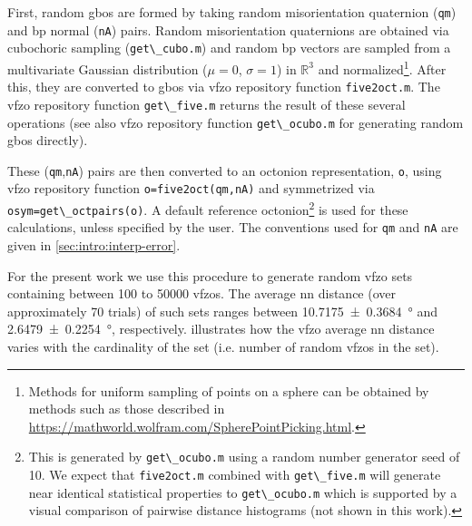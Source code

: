 \documentclass[final,twocolumn,12pt]{elsarticle}
\newcommand{\matlab}[1]{\mbox{\lstinline[style=Matlab-editor]{#1}}}
\newcommand{\vfzorepo}{\gls{vfzo} repository}
\begin{document}
First, random \glspl{gbo} are formed by taking random misorientation quaternion (\matlab{qm}) and \gls{bp} normal (\matlab{nA}) pairs. Random misorientation quaternions are obtained via cubochoric sampling \cite{singhOrientationSamplingDictionarybased2016} (\matlab{get\_cubo.m}) and random \gls{bp} vectors are sampled from a multivariate Gaussian distribution ($\mu=0$, $\sigma=1$) in $\mathbb{R}^3$ and normalized\footnote{Methods for uniform sampling of points on a sphere can be obtained by methods such as those described in \url{https://mathworld.wolfram.com/SpherePointPicking.html}. }. After this, they are converted to \glspl{gbo} via \vfzorepo{} function \matlab{five2oct.m}. The \vfzorepo{} function \matlab{get\_five.m} returns the result of these several operations (see also \vfzorepo{} function \matlab{get\_ocubo.m} for generating random \glspl{gbo} directly).

These (\matlab{qm},\matlab{nA}) pairs are then converted to an octonion representation, \matlab{o}, using \vfzorepo{} function \matlab{o=five2oct(qm,nA)} and symmetrized via \matlab{osym=get\_octpairs(o)}. A default reference octonion\footnote{This is generated by \matlab{get\_ocubo.m} using a random number generator seed of 10. We expect that \matlab{five2oct.m} combined with \matlab{get\_five.m} will generate near identical statistical properties to \matlab{get\_ocubo.m} which is supported by a visual comparison of pairwise distance histograms (not shown in this work).} is used for these calculations, unless specified by the user. The conventions used for \matlab{qm} and \matlab{nA} are given in \cref{sec:intro:interp-error}.

For the present work we use this procedure to generate random \gls{vfzo} sets containing between \num{100} to \num{50000} \glspl{vfzo}. The average \gls{nn} distance (over approximately 70 trials) of such sets ranges between \SI{10.7175 \pm 0.3684}{\degree} and \SI{2.6479 \pm 0.2254}{\degree}, respectively.  illustrates how the \gls{vfzo} average \gls{nn} distance varies with the cardinality of the set (i.e. number of random \glspl{vfzo} in the set). 
\end{document}
